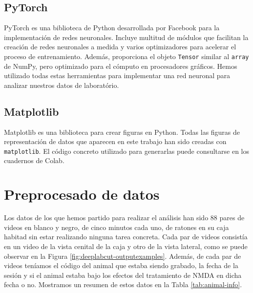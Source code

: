 \subsection*{PyTorch}
PyTorch \cite{pytorch-paper} es una biblioteca de Python desarrollada por Facebook para la implementación de redes neuronales. Incluye multitud de módulos que facilitan la creación de redes neuronales a medida y varios optimizadores para acelerar el proceso de entrenamiento. Además, proporciona el objeto \texttt{Tensor} similar al \texttt{array} de NumPy, pero optimizado para el cómputo en procesadores gráficos. Hemos utilizado todas estas herramientas para implementar una red neuronal para analizar nuestros datos de laboratório.

\subsection*{Matplotlib}
Matplotlib es una biblioteca para crear figuras en Python. Todas las figuras de representación de datos que aparecen en este trabajo han sido creadas con \texttt{matplotlib}. El código concreto utilizado para generarlas puede consultarse en los cuadernos de Colab.

\section{Preprocesado de datos} \label{sec:preprocesado}

Los datos de los que hemos partido para realizar el análisis han sido 88 pares de videos en blanco y negro, de cinco minutos cada uno, de ratones en su caja habitad sin estar realizando ninguna tarea concreta. Cada par de videos consistía en un video de la vista cenital de la caja y otro de la vista lateral, como se puede observar en la Figura \ref{fig:deeplabcut-outputexamples}. Además, de cada par de videos teníamos el código del animal que estaba siendo grabado, la fecha de la sesión y si el animal estaba bajo los efectos del tratamiento de NMDA en dicha fecha o no. Mostramos un resumen de estos datos en la Tabla \ref{tab:animal-info}.

